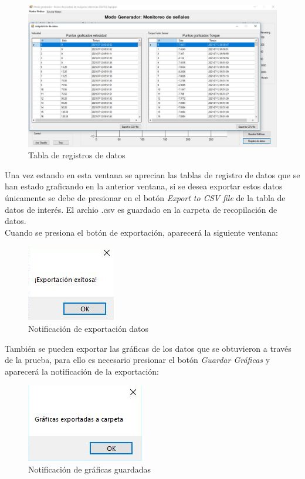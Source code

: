 \documentclass[12pt,titlepage]{article}
\begin{document}
\begin{figure}[H]
\hspace*{2.3cm} 
\includegraphics[scale=0.42]{regData}
\caption{Tabla de registros de datos}
\end{figure}
\newpage
Una vez estando en esta ventana se aprecian las tablas de registro de datos que se han estado graficando en la anterior ventana, si se desea exportar estos datos únicamente se debe de presionar en el botón  \textit{Export to CSV file} de la tabla de datos de interés. El archio .csv es guardado en la carpeta de recopilación de datos. \\ 

Cuando se presiona el botón de exportación, aparecerá la siguiente ventana: \\ 

\begin{figure}[H]
\hspace*{7.3cm} 
\includegraphics[scale=0.89]{export_data22}
\caption{Notificación de exportación datos}
\end{figure}

También se pueden exportar las gráficas de los datos que se obtuvieron a través de la prueba, para ello es necesario presionar el botón \textit{Guardar Gráficas} y aparecerá la notificación de la exportación: \\

\begin{figure}[H]
\hspace*{7.3cm} 
\includegraphics[scale=0.80]{save_graficas}
\caption{Notificación de gráficas guardadas}
\end{figure}
\end{document}
